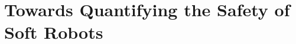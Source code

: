 \chapter{Towards Quantifying the Safety of Soft Robots}
\label{chp:safetymetric}

\begin{foreword}

\end{foreword}

